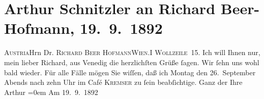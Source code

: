 

         
         \renewcommand{\erwaehntePersonen}{Personen: Richard Beer-Hofmann}
         \renewcommand{\erwaehnteOrte}{Orte: Café Kremser, Theater in der Josefstadt, Venedig, Wien, Wollzeile, Österreich}
         \renewcommand{\erwaehnteWerke}{}
               \section[Arthur Schnitzler an Richard Beer-Hofmann, 19. 9. 1892]{ Arthur Schnitzler an Richard Beer-Hofmann, 19. 9. 1892}\nopagebreak{}\rehead{ }\begin{ledgroupsized}[t]{13cm}\normalsize\beginnumbering{} \toendnotes[C]{\smallbreak\pagebreak[2]} 
\pstart{}{\pb}\textsc{Austria}\pend{}\pstart{}Hrn Dr. \textsc{Richard Beer Hofmann}\pend{}\pstart{}\textsc{Wien.}\pend{}\pstart{}\textsc{I Wollzeile 15}.\pend{}{\bigskip}\pstart
           \noindent{}{\pb}Ich will Ihnen nur, mein lieber Richard, aus Venedig die herzlichſten Grüße
               ſagen. Wir ſehn uns wohl bald wieder. Für alle Fälle mögen Sie wiſſen, {\pb}daß ich Montag den 26. September Abends
               nach zehn Uhr im Café \textsc{Kremser} zu ſein beabſichtige.\pend
           \pstart
           Ganz der Ihre{\\[\baselineskip]}\spacefill\mbox{Arthur}\pend
           \leftskip=0em{}\pstart
           Am 19. 9. 1892\pend
           
         
         \endnumbering{}\end{ledgroupsized}  \newcommand{\dateiname}{L00124}\newcommand{\titel}{Arthur Schnitzler an Richard Beer-Hofmann, 19. 9. 1892}\newcommand{\editorInnen}{Martin Anton Müller und Gerd-Hermann Susen}
      